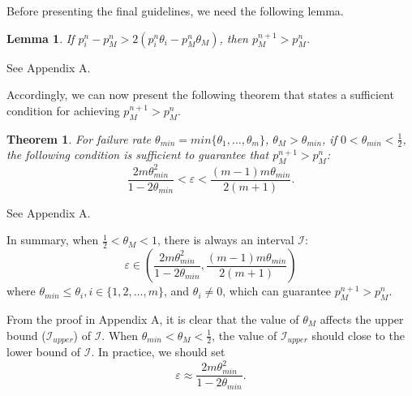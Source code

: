\documentclass[10pt,journal,compsoc]{IEEEtran}
\begin{document}
Before presenting the final guidelines, we need the following lemma.
\newtheorem{lem}{Lemma}
\label{Lemma}
\begin{lem}
  If $p_i^{n} - p_M^{n} > 2(p_i^{n}\theta_i - p_M^{n}\theta_M)$, then $p_M^{n + 1} > p_M^{n}$.
\end{lem}
\begin{IEEEproof}
See Appendix A.
\end{IEEEproof}

\vspace{1ex}
Accordingly, we can now present the following theorem that states a sufficient condition for achieving $p_M^{n + 1} > p_M^{n}$.
\newtheorem{theo}{Theorem}
\label{theorem}
\begin{theo}
  For failure rate $\theta_{min} = min\{\theta_1, \ldots, \theta_m\}$, $\theta_M > \theta_{min}$, if $0 < \theta_{min} < \frac{1}{2}$, the following condition is sufficient to guarantee that $p_M^{n + 1} > p_M^{n}$:
\begin{equation}
\label{equa:results}
  \displaystyle\frac{2m\theta_{min}^2}{1-2\theta_{min}} < \varepsilon < \displaystyle\frac{(m-1)m\theta_{min}}{2(m + 1)}.
\end{equation}
\end{theo}
\begin{IEEEproof}
See Appendix A.
\end{IEEEproof}

\vspace{1ex}
In summary, when $\frac{1}{2} < \theta_M < 1$, there is always an interval $\mathcal{I}$:
\begin{equation}
  \varepsilon \in (\displaystyle\frac{2m\theta_{min}^2}{1 - 2\theta_{min}}, \displaystyle\frac{(m - 1)m\theta_{min}}{2(m + 1)})
\end{equation}
where $\theta_{min} \le \theta_i, i \in \{1, 2, \ldots, m\}$, and $\theta_i \ne 0$, which can guarantee $p_M^{n+1} > p_M^n$.

\vspace{1ex}
From the proof in Appendix A, it is clear that the value of $\theta_M$ affects the upper bound ($\mathcal{I}_{upper}$) of $\mathcal{I}$.
When $\theta_{min} < \theta_M < \frac{1}{2}$, the value of $\mathcal{I}_{upper}$ should close to the lower bound of $\mathcal{I}$.
In practice, we should set
\begin{equation}
\label{euqtion:approxValue}
  \varepsilon \approx \frac{2m\theta_{min}^2}{1-2\theta_{min}}.
\end{equation}
\end{document}
